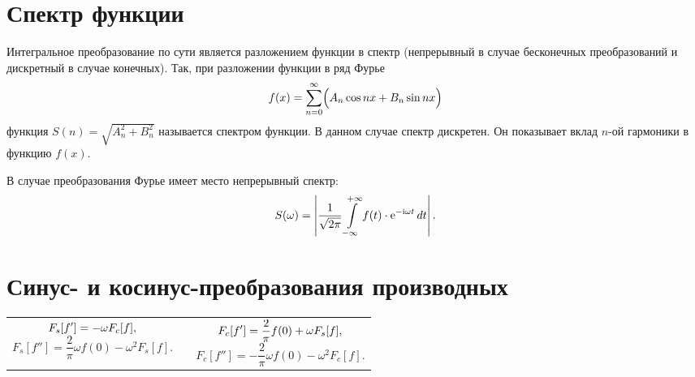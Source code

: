 \section{Спектр функции}
Интегральное преобразование по сути является разложением функции в спектр
(непрерывный в случае бесконечных преобразований и дискретный в случае
конечных). Так, при разложении функции в ряд Фурье
\[ \displaystyle
   f(x) = \sum\limits_{n=0}^\infty \Bigl(A_n\cos nx + B_n\sin nx\Bigr)
\]
функция \( S(n) = \sqrt{A_n^2 + B_n^2} \) называется спектром функции. В данном
случае спектр дискретен. Он показывает вклад \( n \)-ой гармоники в функцию
\( f(x) \).

В случае преобразования Фурье имеет место непрерывный спектр:
\[ \displaystyle
    S(\omega) = \left|\frac{1}{\sqrt{2\pi}}\int\limits_{-\infty}^{+\infty} f(t)
    \cdot\mathrm{e}^{-\mathrm{i}\omega t}\,dt\right|.
\]

\section{Синус- и косинус-преобразования производных}
\begin{table}[h!]
    \begin{tabular}{C{.47}cC{.47}}
        \( \displaystyle
            F_s[f'] = -\omega F_c[f],
        \)
        \[
            F_s[f''] = \frac{2}{\pi}\omega f(0) - \omega^2 F_s[f].
        \] & \hfill &
        \( \displaystyle
            F_c[f'] = \frac{2}{\pi}f(0) + \omega F_s[f],
        \)
        \[
            F_c[f''] = -\frac{2}{\pi}\omega f(0) - \omega^2 F_c[f].
        \] 
    \end{tabular}
\end{table}
\newpage
